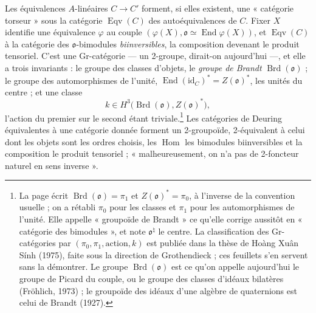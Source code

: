 \documentclass[11pt,a4paper]{article}
\begin{document}
Les équivalences $A$-linéaires $C \to C'$ forment, si elles existent, une
« catégorie torseur » sous la catégorie $\operatorname{Eqv}(C)$ des
autoéquivalences de $C$. Fixer $X$ identifie une équivalence $\varphi$ au couple
$(\varphi(X), \mathfrak{o} \simeq \operatorname{End}\varphi(X))$, et
$\operatorname{Eqv}(C)$ à la catégorie des $\mathfrak{o}$-bimodules
\emph{biinversibles}, la composition devenant le produit tensoriel. C'est une
Gr-catégorie --- un 2-groupe, dirait-on aujourd'hui ---, et elle a trois
invariants : le groupe des classes d'objets, le \emph{groupe de Brandt}
$\operatorname{Brd}(\mathfrak{o})$ ; le groupe des automorphismes de l'unité,
$\operatorname{End}(\mathrm{id}_{C})^{*} = Z(\mathfrak{o})^{*}$, les unités du
centre ; et une classe
\[
  k \in H^{3}\bigl(\operatorname{Brd}(\mathfrak{o}), Z(\mathfrak{o})^{*}\bigr) ,
\]
l'action du premier sur le second étant triviale.\footnote{La page écrit
$\operatorname{Brd}(\mathfrak{o}) = \pi_{1}$ et $Z(\mathfrak{o})^{*} = \pi_{0}$,
à l'inverse de la convention usuelle ; on a rétabli $\pi_{0}$ pour les classes
et $\pi_{1}$ pour les automorphismes de l'unité. Elle appelle « groupoïde de
Brandt » ce qu'elle corrige aussitôt en « catégorie des bimodules », et note
$\mathfrak{o}^{\natural}$ le centre. La classification des Gr-catégories par
$(\pi_{0}, \pi_{1}, \text{action}, k)$ est publiée dans la thèse de Hoàng Xuân
Sính (1975), faite sous la direction de Grothendieck ; ces feuillets s'en
servent sans la démontrer. Le groupe $\operatorname{Brd}(\mathfrak{o})$ est ce
qu'on appelle aujourd'hui le groupe de Picard du couple, ou le groupe des classes
d'idéaux bilatères (Fröhlich, 1973) ; le groupoïde des idéaux d'une algèbre de
quaternions est celui de Brandt (1927).} Les catégories de Deuring équivalentes
à une catégorie donnée forment un 2-groupoïde, 2-équivalent à celui dont les
objets sont les ordres choisis, les $\operatorname{Hom}$ les bimodules
biinversibles et la composition le produit tensoriel ; « malheureusement, on
n'a pas de 2-foncteur naturel en sens inverse ».
\end{document}
